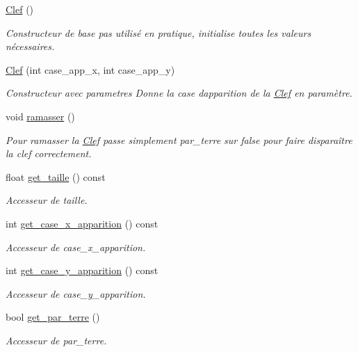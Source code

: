 \begin{DoxyCompactItemize}
\item 
\hyperlink{classClef_ad68f9748c13f66f3ec4c361a867b99fa}{Clef} ()
\begin{DoxyCompactList}\small\item\em Constructeur de base pas utilisé en pratique, initialise toutes les valeurs nécessaires. \end{DoxyCompactList}\item 
\hyperlink{classClef_ad3e83e9ad86f4506f3b2420beb11d10d}{Clef} (int case\+\_\+app\+\_\+x, int case\+\_\+app\+\_\+y)
\begin{DoxyCompactList}\small\item\em Constructeur avec parametres Donne la case d\textquotesingle{}apparition de la \hyperlink{classClef}{Clef} en paramètre. \end{DoxyCompactList}\item 
void \hyperlink{classClef_a07c37edf79ecae3c89d69cb82a8cf826}{ramasser} ()
\begin{DoxyCompactList}\small\item\em Pour ramasser la \hyperlink{classClef}{Clef} passe simplement {\itshape par\+\_\+terre} sur false pour faire disparaître la clef correctement. \end{DoxyCompactList}\item 
float \hyperlink{classClef_af7651d704ce59319979a15b3e5ef8491}{get\+\_\+taille} () const 
\begin{DoxyCompactList}\small\item\em Accesseur de {\itshape taille}. \end{DoxyCompactList}\item 
int \hyperlink{classClef_aa3d2fd53a112f04c811b6701da03444b}{get\+\_\+case\+\_\+x\+\_\+apparition} () const 
\begin{DoxyCompactList}\small\item\em Accesseur de {\itshape case\+\_\+x\+\_\+apparition}. \end{DoxyCompactList}\item 
int \hyperlink{classClef_abc8859931db914755efb2d289fab7757}{get\+\_\+case\+\_\+y\+\_\+apparition} () const 
\begin{DoxyCompactList}\small\item\em Accesseur de {\itshape case\+\_\+y\+\_\+apparition}. \end{DoxyCompactList}\item 
bool \hyperlink{classClef_afc62d6a9cb6824258b09b078c286a561}{get\+\_\+par\+\_\+terre} ()
\begin{DoxyCompactList}\small\item\em Accesseur de {\itshape par\+\_\+terre}. \end{DoxyCompactList}\end{DoxyCompactItemize}


